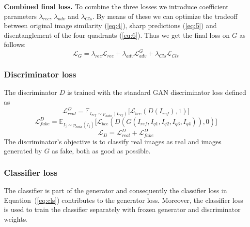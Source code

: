 \documentclass[12pt,a4paper]{article}
\begin{document}
\textbf{Combined final loss.} To combine the three losses we introduce coefficient parameters $\lambda_{rec}$, $\lambda_{adv}$ and $\lambda_{Cls}$. By means of these we can optimize the tradeoff between original image similarity (\ref{eq:4}), sharp predictions (\ref{eq:5}) and disentanglement of the four quadrants (\ref{eq:6}). Thus we get the final loss on $G$ as follows:
\begin{equation} \label{eq:g_loss_comp}
    \mathcal{L}_{G} = \lambda_{rec} \mathcal{L}_{rec} + \lambda_{adv} \mathcal{L}^G_{adv} + \lambda_{Cls} \mathcal{L}_{Cls}
\end{equation}

\subsubsection{Discriminator loss}
The discriminator $D$ is trained with the standard GAN discriminator loss defined as
\begin{equation} \label{eq:lorbms_D_real}
    \mathcal{L}^D_{real} = \mathbb{E}_{I_{ref}\sim p_{data} (I_{ref})}\big[ \mathcal{L}_{bce}(D(I_{ref}), 1)\big]
\end{equation}
\begin{equation} \label{eq:lorbms_D_fake}
    \mathcal{L}^D_{fake} =  \mathbb{E}_{I_{j}\sim p_{data} (I_{j})}\big[ \mathcal{L}_{bce}(D(G(I_{ref},I_{q1},I_{q2},I_{q3},I_{q4})), 0)\big]
\end{equation}
\begin{equation} \label{eq:lorbms_D}
    \mathcal{L}_{D} = \mathcal{L}^D_{real} + \mathcal{L}^D_{fake}
\end{equation}
The discriminator's objective is to classify real images as real and images generated by $G$ as fake, both as good as possible.

\subsubsection{Classifier loss}
The classifier is part of the generator and consequently the classifier loss in Equation~(\ref{eq:cls}) contributes to the generator loss. Moreover, the classifier loss is used to train the classifier separately with frozen generator and discriminator weights.


\end{document}
